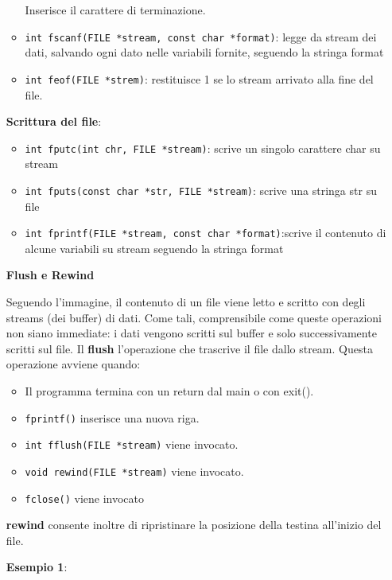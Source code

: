\begin{flushleft}
\begin{itemize}
\begin{itemize}
                    Inserisce il carattere di terminazione. 
            \item \texttt{int fscanf(FILE *stream, const char *format)}: legge da stream dei dati, salvando 
                    ogni dato nelle variabili fornite, seguendo la stringa format 
            \item \texttt{int feof(FILE *strem)}: restituisce 1 se lo stream \ace arrivato alla fine del file.
          \end{itemize}
          \textbf{Scrittura del file}:
          \begin{itemize}
            \item \texttt{int fputc(int chr, FILE *stream)}: scrive un singolo carattere char  su stream 
            \item \texttt{int fputs(const char *str, FILE *stream)}: scrive una stringa str su file 
            \item \texttt{int fprintf(FILE *stream, const char *format)}:scrive il contenuto di alcune variabili su stream 
                    seguendo la stringa format
          \end{itemize}
          \textbf{Flush e Rewind} \par 
          Seguendo l'immagine, il contenuto di un file viene letto e scritto con degli streams 
          (dei buffer) di dati. Come tali, \ace comprensibile come queste operazioni non siano 
          immediate: i dati vengono scritti sul buffer e solo successivamente scritti sul file. Il 
          \textbf{flush} \ace l'operazione che trascrive il file dallo stream. Questa operazione avviene 
          quando: 
          \begin{itemize}
            \item Il programma termina con un return dal main o con exit().
            \item \texttt{fprintf()} inserisce una nuova riga.
            \item \texttt{int fflush(FILE *stream)} viene invocato.
            \item \texttt{void rewind(FILE *stream)} viene invocato.
            \item \texttt{fclose()} viene invocato
          \end{itemize}
          \textbf{rewind} consente inoltre di ripristinare la posizione della testina all'inizio del file. \\
          \begin{flushleft}
            \textbf{Esempio 1}:\\

\end{flushleft}
\end{itemize}
\end{flushleft}
